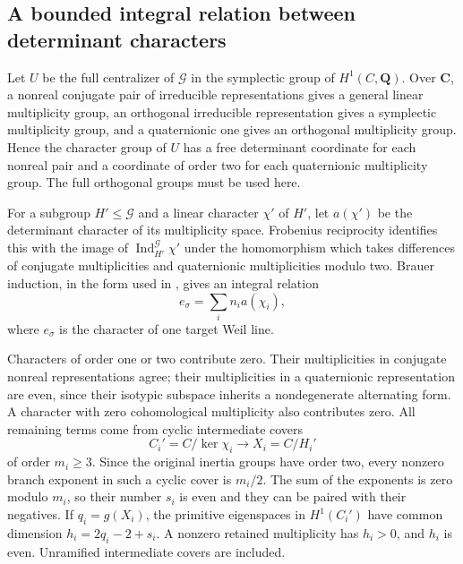 \documentclass[11pt]{article}
\theoremstyle{definition}
\theoremstyle{remark}
\newcommand{\Q}{\mathbf Q}
\newcommand{\C}{\mathbf C}
\begin{document}
\subsection{A bounded integral relation between determinant characters}

Let $U$ be the full centralizer of $\mathcal G$ in the symplectic group
of $H^1(C,\Q)$. Over $\C$, a nonreal conjugate pair of irreducible
representations gives a general linear multiplicity group, an orthogonal
irreducible representation gives a symplectic multiplicity group, and
a quaternionic one gives an orthogonal multiplicity group. Hence the
character group of $U$ has a free determinant coordinate for each
nonreal pair and a coordinate of order two for each quaternionic
multiplicity group. The full orthogonal groups must be used here.

For a subgroup $H'\le\mathcal G$ and a linear character $\chi'$ of
$H'$, let $a(\chi')$ be the determinant character of its multiplicity
space. Frobenius reciprocity identifies this with the image of
$\operatorname{Ind}_{H'}^{\mathcal G}\chi'$ under the homomorphism
which takes differences of conjugate multiplicities and quaternionic
multiplicities modulo two. Brauer induction, in the form used in
\cite[Theorem~5.1]{Severn}, gives an integral relation
\begin{equation}\label{eq:eis-supplier-relation}
 e_\sigma=\sum_i n_i a(\chi_i),
\end{equation}
where $e_\sigma$ is the character of one target Weil line.

Characters of order one or two contribute zero. Their multiplicities
in conjugate nonreal representations agree; their multiplicities in
a quaternionic representation are even, since their isotypic subspace
inherits a nondegenerate alternating form. A character with zero
cohomological multiplicity also contributes zero. All remaining terms
come from cyclic intermediate covers
\[
 C_i'=C/\ker\chi_i\longrightarrow X_i=C/H_i'
\]
of order $m_i\ge3$. Since the original inertia groups have order two,
every nonzero branch exponent in such a cyclic cover is $m_i/2$.
The sum of the exponents is zero modulo $m_i$, so their number $s_i$ is
even and they can be paired with their negatives. If $q_i=g(X_i)$,
the primitive eigenspaces in $H^1(C_i')$ have common dimension
$h_i=2q_i-2+s_i$. A nonzero retained multiplicity has $h_i>0$, and
$h_i$ is even. Unramified intermediate covers are included.
\end{document}

